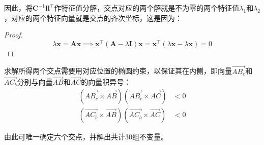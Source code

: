 \documentclass{article}
\begin{document}
因此，将$\mathbf{C}^{-1}\mathbf{ll}^\top$作特征值分解，交点对应的两个解就是不为零的两个特征值$\lambda_1$和$\lambda_2$，对应的两个特征向量就是交点的齐次坐标，这是因为：
\begin{proof}
\begin{equation*}
  \lambda\mathbf{x=Ax}\implies\mathbf{x}^\top(\mathbf{A}-{\lambda}\mathbf{I})\mathbf{x}=\mathbf{x}^\top (\lambda \mathbf{x}-\lambda\mathbf{x})=0
\end{equation*}
\end{proof}\par
求解所得两个交点需要用对应位置的椭圆约束，以保证其在内侧，即向量$\overrightarrow{AB_c}$和$\overrightarrow{AC_b}$分别与向量$\overrightarrow{AB}$和$\overrightarrow{AC}$的向量积异号：
\begin{align*}
  (\overrightarrow{AB_c}\times\overrightarrow{AB})(\overrightarrow{AB_c}\times\overrightarrow{AC})&<0\\
  (\overrightarrow{AC_b}\times\overrightarrow{AB})(\overrightarrow{AC_b}\times\overrightarrow{AC})&<0
\end{align*}\par
由此可唯一确定六个交点，并解出共计30组不变量。
\end{document}
